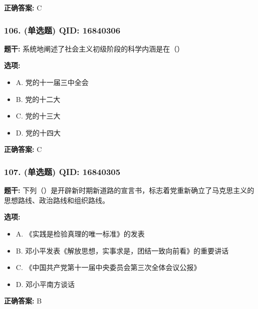 \documentclass[12pt,UTF8]{ctexart}
\begin{document}
\textbf{正确答案:}
C

\vspace{0.3em}\hrulefill\vspace{0.7em}

\subsubsection*{106. (单选题) \small QID: 16840306}

\textbf{题干:}
系统地阐述了社会主义初级阶段的科学内涵是在（）

\textbf{选项:}
\begin{itemize}[leftmargin=*]

  \item A. 党的十一届三中全会

  \item B. 党的十二大

  \item C. 党的十三大

  \item D. 党的十四大

\end{itemize}

\textbf{正确答案:}
C

\vspace{0.3em}\hrulefill\vspace{0.7em}

\subsubsection*{107. (单选题) \small QID: 16840305}

\textbf{题干:}
下列（）是开辟新时期新道路的宣言书，标志着党重新确立了马克思主义的思想路线、政治路线和组织路线。

\textbf{选项:}
\begin{itemize}[leftmargin=*]

  \item A. 《实践是检验真理的唯一标准》的发表

  \item B. 邓小平发表《解放思想，实事求是，团结一致向前看》的重要讲话

  \item C. 《中国共产党第十一届中央委员会第三次全体会议公报》

  \item D. 邓小平南方谈话

\end{itemize}

\textbf{正确答案:}
B
\end{document}
